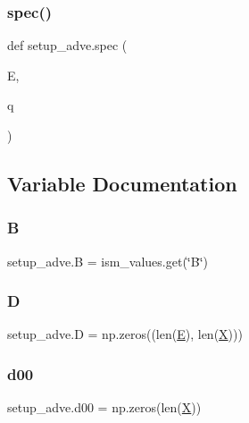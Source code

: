 \mbox{\label{namespacesetup__adve_a06d5e69febd8c6f846b62eea7e0bb866}} 
\subsubsection{\texorpdfstring{spec()}{spec()}}
{\footnotesize\ttfamily def setup\+\_\+adve.\+spec (\begin{DoxyParamCaption}\item[{}]{E,  }\item[{}]{q }\end{DoxyParamCaption})}



\subsection{Variable Documentation}
\mbox{\label{namespacesetup__adve_a8407cf4af8a6a0ba27e5697dfc8b2796}} 
\subsubsection{\texorpdfstring{B}{B}}
{\footnotesize\ttfamily setup\+\_\+adve.\+B = ism\+\_\+values.\+get(\char`\"{}B\char`\"{})}

\mbox{\label{namespacesetup__adve_ab9ff9bd6418988e9b328c4dfaafd0fac}} 
\subsubsection{\texorpdfstring{D}{D}}
{\footnotesize\ttfamily setup\+\_\+adve.\+D = np.\+zeros((len(\hyperlink{namespacesetup__adve_a924af0e190ae028ed71b0d7b9dd75fed}{E}), len(\hyperlink{namespacesetup__adve_ac58005e2708a29ed334e0542dd68d336}{X})))}

\mbox{\label{namespacesetup__adve_a50e86368d13d88650b27704580019acd}} 
\subsubsection{\texorpdfstring{d00}{d00}}
{\footnotesize\ttfamily setup\+\_\+adve.\+d00 = np.\+zeros(len(\hyperlink{namespacesetup__adve_ac58005e2708a29ed334e0542dd68d336}{X}))}



